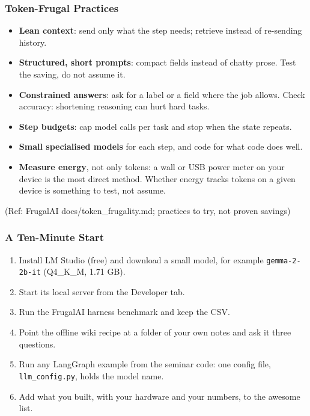 \begin{frame}[fragile]\frametitle{Token-Frugal Practices}
\begin{itemize}
\item \textbf{Lean context}: send only what the step needs; retrieve instead of re-sending history.
\item \textbf{Structured, short prompts}: compact fields instead of chatty prose. Test the saving, do not assume it.
\item \textbf{Constrained answers}: ask for a label or a field where the job allows. Check accuracy: shortening reasoning can hurt hard tasks.
\item \textbf{Step budgets}: cap model calls per task and stop when the state repeats.
\item \textbf{Small specialised models} for each step, and code for what code does well.
\item \textbf{Measure energy}, not only tokens: a wall or USB power meter on your device is the most direct method. Whether energy tracks tokens on a given device is something to test, not assume.
\end{itemize}
{\tiny (Ref: FrugalAI docs/token\_frugality.md; practices to try, not proven savings)}
\end{frame}

\begin{frame}[fragile]\frametitle{A Ten-Minute Start}
\begin{enumerate}
\item Install LM Studio (free) and download a small model, for example \texttt{gemma-2-2b-it} (Q4\_K\_M, 1.71 GB).
\item Start its local server from the Developer tab.
\item Run the FrugalAI harness benchmark and keep the CSV.
\item Point the offline wiki recipe at a folder of your own notes and ask it three questions.
\item Run any LangGraph example from the seminar code: one config file, \texttt{llm\_config.py}, holds the model name.
\item Add what you built, with your hardware and your numbers, to the awesome list.
\end{enumerate}
\end{frame}
